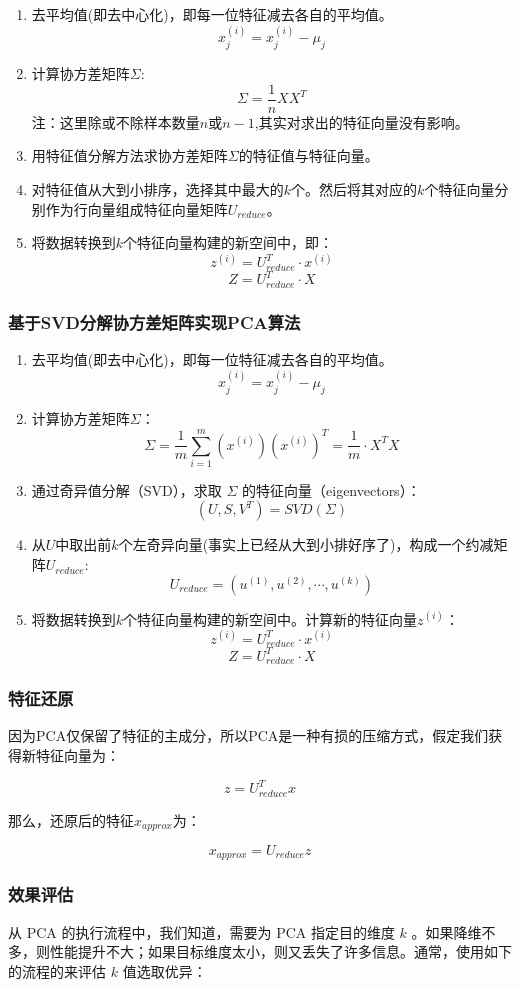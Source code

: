\documentclass{ML}
\begin{document}
\begin{enumerate}
	\item 去平均值(即去中心化)，即每一位特征减去各自的平均值。$$x^{(i)}_j=x^{(i)}_j − \mu_j$$
	\item 计算协方差矩阵$\Sigma$:$$\Sigma = \frac{1}{n}XX^T$$注：这里除或不除样本数量$n$或$n-1$,其实对求出的特征向量没有影响。
	\item 用特征值分解方法求协方差矩阵$\Sigma$的特征值与特征向量。
	\item 对特征值从大到小排序，选择其中最大的$k$个。然后将其对应的$k$个特征向量分别作为行向量组成特征向量矩阵$U_{reduce}$。
	\item 将数据转换到$k$个特征向量构建的新空间中，即：$$z^{(i)}=U^T_{reduce}⋅x^{(i)}$$ $$Z=U^T_{reduce}⋅X$$
\end{enumerate}

\subsubsection{基于SVD分解协方差矩阵实现PCA算法}

\begin{enumerate}
	\item 去平均值(即去中心化)，即每一位特征减去各自的平均值。$$x^{(i)}_j=x^{(i)}_j − \mu_j$$
	\item 计算协方差矩阵$\Sigma$：$$\Sigma = \frac{1}{m}\sum_{i=1}^m(x^{(i)})(x^{(i)})^T=\frac{1}{m}⋅X^TX$$
	\item 通过奇异值分解（SVD），求取 $\Sigma$ 的特征向量（eigenvectors）：$$(U,S,V^T)=SVD(\Sigma)$$
	\item 从$U$中取出前$k$个左奇异向量(事实上已经从大到小排好序了)，构成一个约减矩阵$U_{reduce}$:$$U_{reduce}=(u^{(1)},u^{(2)},⋯,u^{(k)})$$
	\item 将数据转换到$k$个特征向量构建的新空间中。计算新的特征向量$z^{(i)}$：$$z^{(i)}=U^T_{reduce}⋅x^{(i)}$$ $$Z = U^T_{reduce}⋅X$$
\end{enumerate}

\subsubsection{特征还原}

因为PCA仅保留了特征的主成分，所以PCA是一种有损的压缩方式，假定我们获得新特征向量为：

$$z=U^T_{reduce}x$$

那么，还原后的特征$x_{approx}$为：

$$x_{approx}=U_{reduce}z$$

\subsubsection{效果评估}
从 PCA 的执行流程中，我们知道，需要为 PCA 指定目的维度 $k$ 。如果降维不多，则性能提升不大；如果目标维度太小，则又丢失了许多信息。通常，使用如下的流程的来评估  $k$  值选取优异：
\end{document}

